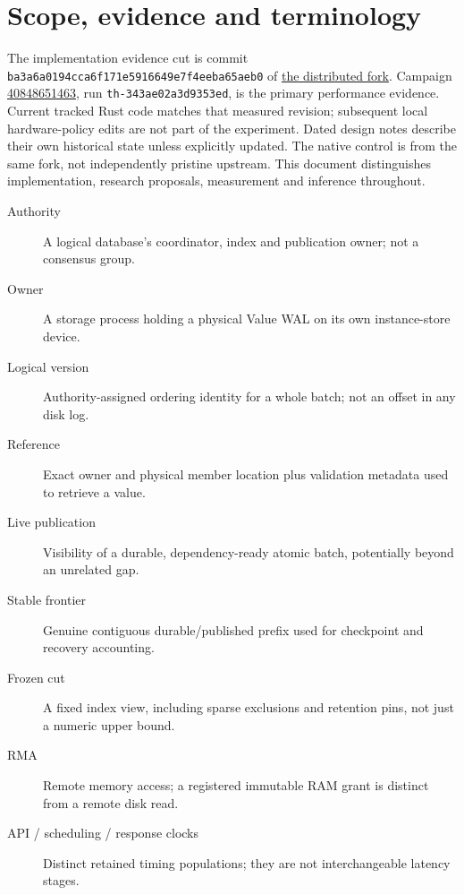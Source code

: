 \documentclass[11pt,a4paper]{article}
\begin{document}
\section{Scope, evidence and terminology}\label{sec:scope}
The implementation evidence cut is commit \texttt{ba3a6a0194cca6f171e5916649e7f4eeba65aeb0} of \href{https://github.com/Loris-EPFL/tidehunter-distributed/tree/ba3a6a0194cca6f171e5916649e7f4eeba65aeb0}{the distributed fork}. Campaign \href{https://github.com/Loris-EPFL/tidehunter-distributed/actions/runs/40848651463}{40848651463}, run \texttt{th-343ae02a3d9353ed}, is the primary performance evidence. Current tracked Rust code matches that measured revision; subsequent local hardware-policy edits are not part of the experiment. Dated design notes describe their own historical state unless explicitly updated. The native control is from the same fork, not independently pristine upstream. This document distinguishes implementation, research proposals, measurement and inference throughout.

\begin{description}
\item[Authority] A logical database's coordinator, index and publication owner; not a consensus group.
\item[Owner] A storage process holding a physical Value WAL on its own instance-store device.
\item[Logical version] Authority-assigned ordering identity for a whole batch; not an offset in any disk log.
\item[Reference] Exact owner and physical member location plus validation metadata used to retrieve a value.
\item[Live publication] Visibility of a durable, dependency-ready atomic batch, potentially beyond an unrelated gap.
\item[Stable frontier] Genuine contiguous durable/published prefix used for checkpoint and recovery accounting.
\item[Frozen cut] A fixed index view, including sparse exclusions and retention pins, not just a numeric upper bound.
\item[RMA] Remote memory access; a registered immutable RAM grant is distinct from a remote disk read.
\item[API / scheduling / response clocks] Distinct retained timing populations; they are not interchangeable latency stages.
\end{description}
\end{document}

